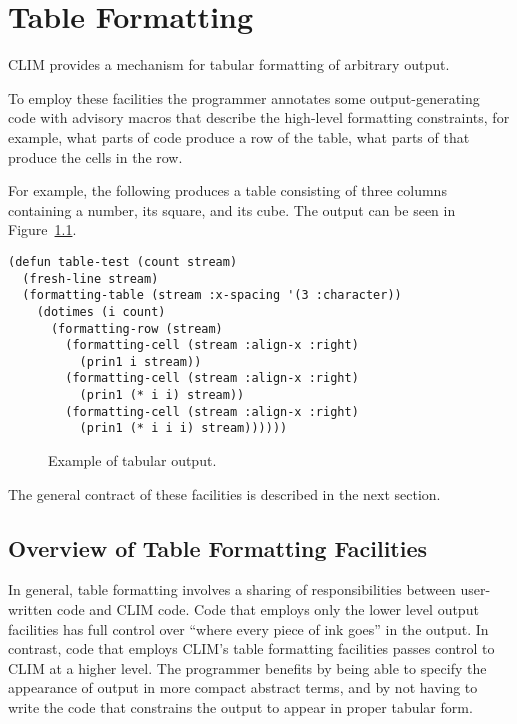 
\chapter {Table Formatting}
\label {table-formatting}

CLIM provides a mechanism for tabular formatting of arbitrary output.

To employ these facilities the programmer annotates some output-generating code
with advisory macros that describe the high-level formatting constraints, for
example, what parts of code produce a row of the table, what parts of that
produce the cells in the row.

For example, the following produces a table consisting of three columns
containing a number, its square, and its cube.  The output can be seen in
Figure~\ref{table-example}.

\begin{verbatim}
(defun table-test (count stream)
  (fresh-line stream)
  (formatting-table (stream :x-spacing '(3 :character))
    (dotimes (i count)
      (formatting-row (stream)
        (formatting-cell (stream :align-x :right)
          (prin1 i stream))
        (formatting-cell (stream :align-x :right)
          (prin1 (* i i) stream))
        (formatting-cell (stream :align-x :right)
          (prin1 (* i i i) stream))))))
\end{verbatim}

\begin{figure}
\centerline{}
\caption{\label{table-example} Example of tabular output.}
\end{figure}

The general contract of these facilities is described in the next section.


\section {Overview of Table Formatting Facilities}

In general, table formatting involves a sharing of responsibilities between
user-written code and CLIM code.  Code that employs only the lower level output
facilities has full control over ``where every piece of ink goes'' in the
output.  In contrast, code that employs CLIM's table formatting facilities
passes control to CLIM at a higher level.  The programmer benefits by being able
to specify the appearance of output in more compact abstract terms, and by not
having to write the code that constrains the output to appear in proper tabular
form.

